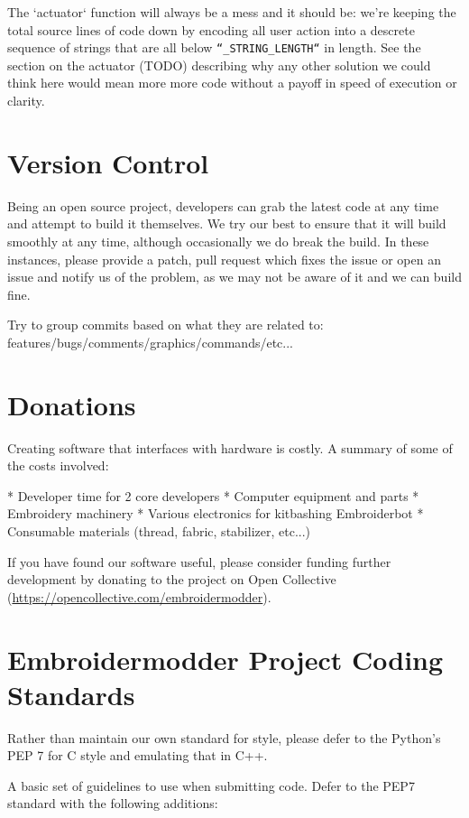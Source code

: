 \documentclass[a4paper]{report}
\begin{document}
The `actuator` function will always be a mess and it should be: we're keeping
the total source lines of code down by encoding all user action into a descrete
sequence of strings that are all below \texttt{``\_STRING\_LENGTH``} in length. See
the section on the actuator (TODO) describing why any other solution we could
think  here would mean more more code without a payoff in speed of execution or
clarity.

\section{Version Control}

Being an open source project, developers can grab the latest code at any time and attempt to build it themselves. We try our best to ensure that it will build smoothly at any time, although occasionally we do break the build. In these instances, please provide a patch, pull request which fixes the issue or open an issue and notify us of the problem, as we may not be aware of it and we can build fine.

Try to group commits based on what they are related to: features/bugs/comments/graphics/commands/etc...

\section{Donations}

Creating software that interfaces with hardware is costly. A summary of some of the costs involved:

* Developer time for 2 core developers
* Computer equipment and parts
* Embroidery machinery
* Various electronics for kitbashing Embroiderbot
* Consumable materials (thread, fabric, stabilizer, etc...)

If you have found our software useful, please consider funding further development by donating to the project on Open Collective
(\url{https://opencollective.com/embroidermodder}).

\section{Embroidermodder Project Coding Standards}

Rather than maintain our own standard for style, please defer to
the Python's PEP 7 %
for C style and emulating that in C++.

A basic set of guidelines to use when submitting code. Defer to the PEP7 standard with the following additions:
\end{document}
